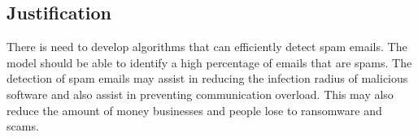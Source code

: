 \subsection{Justification}
There is need to develop algorithms that can efficiently detect spam emails. The model should be able to identify a high percentage of emails that are spams. The detection of spam emails may assist in reducing the infection radius of malicious software and also assist in preventing communication overload. This may also reduce the amount of money businesses and people lose to ransomware and scams.